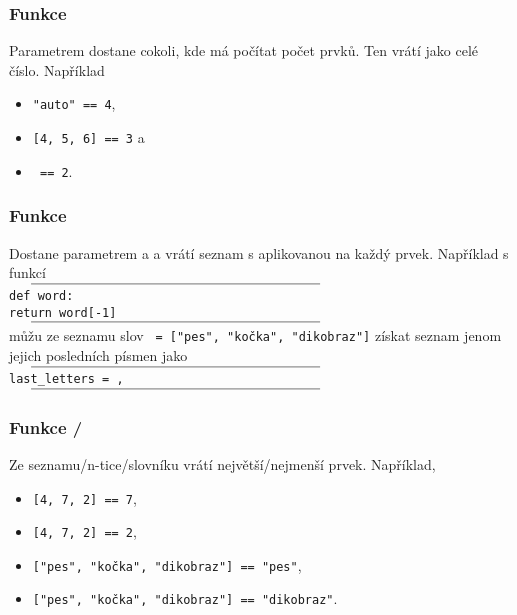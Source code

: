 \begin{frame}
 \frametitle{Funkce \texttt{}}
 \begin{block}{Parametrem dostane cokoli, kde má  počítat počet prvků.
  Ten vrátí jako celé číslo.}
  \pause
  \vspace{1ex}
  Například
  \begin{itemize}
   \item \texttt{"auto"\mlb{)} == 4},
   \item \texttt{[4, 5, 6]\mlb{)} == 3} a
   \item \texttt{\mlb{)} == 2}.
  \end{itemize}
 \end{block}
\end{frame}

\begin{frame}
 \frametitle{Funkce \texttt{}}
 \begin{block}{Dostane parametrem  a  a
  vrátí seznam s  aplikovanou na každý prvek.}
  \pause
  \vspace{1ex}
  Například s funkcí
  $\vcenter{\rule{.6\textwidth}{0.4pt}}$
  \texttt{def word\mlg{)}:}\\
  \hspace{4ex}\texttt{return word[-1]}
  $\vcenter{\rule{.6\textwidth}{0.4pt}}$
  \pause
  můžu ze seznamu slov \texttt{ = ["pes", "kočka", "dikobraz"]}
  získat seznam jenom jejich posledních písmen jako
  $\vcenter{\rule{.6\textwidth}{0.4pt}}$
  \texttt{last\_letters = ,~\mlb{)}}
  $\vcenter{\rule{.6\textwidth}{0.4pt}}$
 \end{block}
\end{frame}

\begin{frame}
 \frametitle{Funkce \texttt{}/\texttt{}}
 \begin{block}{Ze seznamu/n-tice/slovníku vrátí největší/nejmenší prvek.}
  \pause
  Například,
  \begin{itemize}
   \item<1-> \texttt{[4, 7, 2]\mlb{)} == 7},
   \item<1-> \texttt{[4, 7, 2]\mlb{)} == 2},
   \item<2-> \texttt{["pes", "kočka", "dikobraz"]\mlb{)} == "pes"},
   \item<2-> \texttt{["pes", "kočka", "dikobraz"]\mlb{)} ==
    "dikobraz"}.
  \end{itemize}
 \end{block}
\end{frame}

